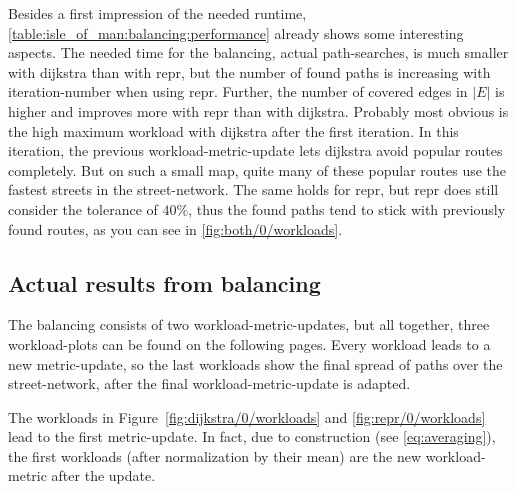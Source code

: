         Besides a first impression of the needed runtime, \vref{table:isle_of_man:balancing:performance} already shows some interesting aspects.
        The needed time for the \gls{balancing}, actual path-searches, is much smaller with \gls{dijkstra} than with \gls{repr}, but the number of found paths is increasing with iteration-number when using \gls{repr}.
        Further, the number of covered edges in $|E|$ is higher and improves more with \gls{repr} than with \gls{dijkstra}.
        Probably most obvious is the high maximum workload with \gls{dijkstra} after the first iteration.
        In this iteration, the previous workload-\gls{metric}-update lets \gls{dijkstra} avoid popular routes completely.
        But on such a small map, quite many of these popular routes use the fastest streets in the street-network.
        The same holds for \gls{repr}, but \gls{repr} does still consider the tolerance of $\si{40 \percent}$, thus the found paths tend to stick with previously found routes, as you can see in \vref{fig:both/0/workloads}.

    \subsection{Actual results from balancing}

        The \gls{balancing} consists of two workload-\gls{metric}-updates, but all together, three workload-plots can be found on the following pages.
        Every workload leads to a new \gls{metric}-update, so the last workloads show the final spread of paths over the street-network, after the final workload-\gls{metric}-update is adapted.

        The workloads in Figure~\ref{fig:dijkstra/0/workloads} and \vref{fig:repr/0/workloads} lead to the first \gls{metric}-update.
        In fact, due to construction (see \vref{eq:averaging}), the first workloads (after normalization by their mean) are the new workload-\gls{metric} after the update.

